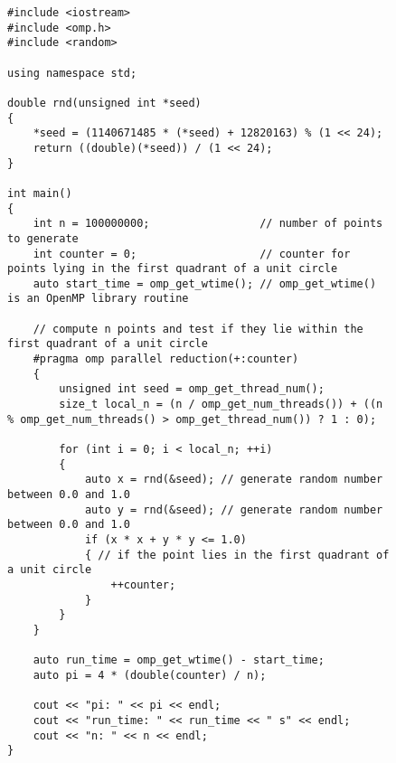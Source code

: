 \documentclass[../../main.tex]{subfiles}
\begin{document}
\begin{figure}[p]
\label{fig:calculate_pi_v2}
\begin{lstlisting}
#include <iostream>
#include <omp.h>
#include <random>

using namespace std;

double rnd(unsigned int *seed)
{
    *seed = (1140671485 * (*seed) + 12820163) % (1 << 24);
    return ((double)(*seed)) / (1 << 24);
}

int main()
{
    int n = 100000000;                 // number of points to generate
    int counter = 0;                   // counter for points lying in the first quadrant of a unit circle
    auto start_time = omp_get_wtime(); // omp_get_wtime() is an OpenMP library routine

    // compute n points and test if they lie within the first quadrant of a unit circle
    #pragma omp parallel reduction(+:counter)
    {
        unsigned int seed = omp_get_thread_num();
        size_t local_n = (n / omp_get_num_threads()) + ((n % omp_get_num_threads() > omp_get_thread_num()) ? 1 : 0);

        for (int i = 0; i < local_n; ++i)
        {
            auto x = rnd(&seed); // generate random number between 0.0 and 1.0
            auto y = rnd(&seed); // generate random number between 0.0 and 1.0
            if (x * x + y * y <= 1.0)
            { // if the point lies in the first quadrant of a unit circle
                ++counter;
            }
        }
    }

    auto run_time = omp_get_wtime() - start_time;
    auto pi = 4 * (double(counter) / n);

    cout << "pi: " << pi << endl;
    cout << "run_time: " << run_time << " s" << endl;
    cout << "n: " << n << endl;
}
\end{lstlisting}
\end{figure}
\end{document}
